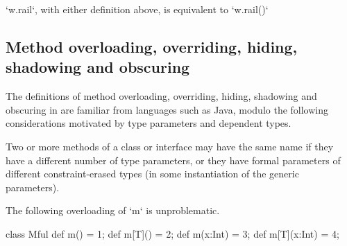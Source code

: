 \xcd`w.rail`, with either definition above, 
is equivalent to 
\xcd`w.rail()`




\subsection{Method overloading, overriding, hiding, shadowing and obscuring}
\label{MethodOverload}



The definitions of method overloading, overriding, hiding, shadowing and
obscuring in \Xten{} are familiar from languages such as Java, modulo the
following considerations motivated by type parameters and dependent types.



Two or more methods of a class or interface may have the same
name if they have a different number of type parameters, or
they have formal parameters of different constraint-erased types (in some instantiation of the
generic parameters). 



\begin{ex}
The following overloading of \xcd`m` is unproblematic.
\begin{xten}
class Mful{
   def m() = 1;
   def m[T]() = 2;
   def m(x:Int) = 3;
   def m[T](x:Int) = 4;
}
\end{xten}
%
\end{ex}


